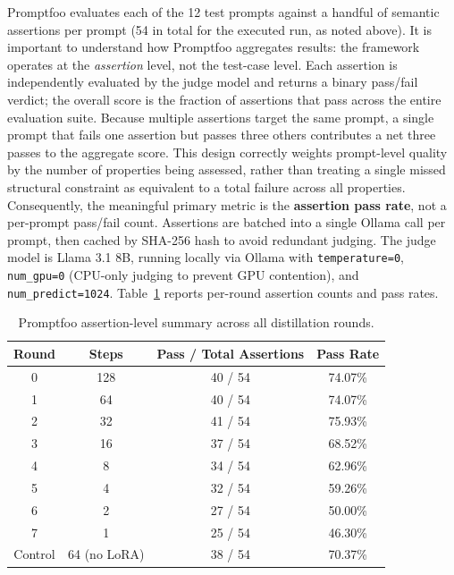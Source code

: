 \documentclass[11pt, a4paper]{article}
\begin{document}
Promptfoo evaluates each of the 12 test prompts against a handful of semantic assertions per prompt (54 in total for the executed run, as noted above). It is important to understand how Promptfoo aggregates results: the framework operates at the \emph{assertion} level, not the test-case level. Each assertion is independently evaluated by the judge model and returns a binary pass/fail verdict; the overall score is the fraction of assertions that pass across the entire evaluation suite. Because multiple assertions target the same prompt, a single prompt that fails one assertion but passes three others contributes a net three passes to the aggregate score. This design correctly weights prompt-level quality by the number of properties being assessed, rather than treating a single missed structural constraint as equivalent to a total failure across all properties. Consequently, the meaningful primary metric is the \textbf{assertion pass rate}, not a per-prompt pass/fail count. Assertions are batched into a single Ollama call per prompt, then cached by SHA-256 hash to avoid redundant judging. The judge model is Llama 3.1 8B, running locally via Ollama with \texttt{temperature=0}, \texttt{num\_gpu=0} (CPU-only judging to prevent GPU contention), and \texttt{num\_predict=1024}. Table~\ref{tab:promptfoo_results} reports per-round assertion counts and pass rates.

\begin{table}[H]
\centering
\caption{Promptfoo assertion-level summary across all distillation rounds.}
\label{tab:promptfoo_results}
\begin{tabular}{@{}cccc@{}}
\toprule
\textbf{Round} & \textbf{Steps} & \textbf{Pass / Total Assertions} & \textbf{Pass Rate} \\ \midrule
0              & 128              & 40 / 54 & 74.07\% \\
1              & 64               & 40 / 54 & 74.07\% \\
2              & 32               & 41 / 54 & 75.93\% \\
3              & 16               & 37 / 54 & 68.52\% \\
4              & 8                & 34 / 54 & 62.96\% \\
5              & 4                & 32 / 54 & 59.26\% \\
6              & 2                & 27 / 54 & 50.00\% \\
7              & 1                & 25 / 54 & 46.30\% \\
Control        & 64 (no LoRA)     & 38 / 54 & 70.37\% \\ \bottomrule
\end{tabular}
\end{table}
\end{document}
